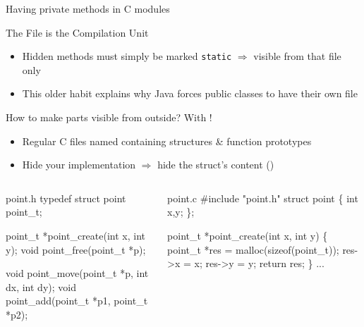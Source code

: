 \begin{frame}[fragile]{Having private methods in C modules}
  \begin{block}{The File is the Compilation Unit}
    \begin{itemize}
    \item Hidden methods must simply be marked \alert{\texttt{static}} $\Rightarrow$
      visible from that file only
    \item This older habit explains why Java forces public classes to have their
      own file
    \end{itemize}
  \end{block}

  \begin{block}{How to make parts visible from outside? With !}
    \begin{itemize}
    \item Regular C files named  containing
      structures \& function prototypes
    \item Hide your implementation $\Rightarrow$ hide the struct's content
      ()
    \end{itemize}
  \end{block}

  \begin{columns}
    \begin{column}{.47\linewidth}
      \begin{boitecode}{point.h}
typedef struct point point_t;              

point_t *point_create(int x, int y);
void point_free(point_t *p);

void point_move(point_t *p, int dx, int dy);      
void point_add(point_t *p1, point_t *p2);      
      \end{boitecode}
    \end{column}

    \begin{column}{.45\linewidth}
      \begin{boitecode}{point.c}
\#include "point.h"
struct point \{
  int x,y;
\};

point_t *point_create(int x, int y) \{
  point_t *res = malloc(sizeof(point_t));
  res->x = x;
  res->y = y;
  return res;
\} 
      ...
      \end{boitecode}
    \end{column}
  \end{columns}
\end{frame}

